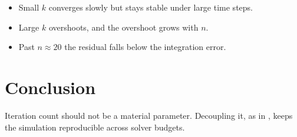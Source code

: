 \documentclass{article}
\begin{document}
\begin{itemize}
  \item Small $k$ converges slowly but stays stable under large time steps.
  \item Large $k$ overshoots, and the overshoot grows with $n$.
  \item Past $n \approx 20$ the residual falls below the integration error.
\end{itemize}

\section{Conclusion}

Iteration count should not be a material parameter. Decoupling it, as in
\cite{macklin2016}, keeps the simulation reproducible across solver budgets.
\end{document}
